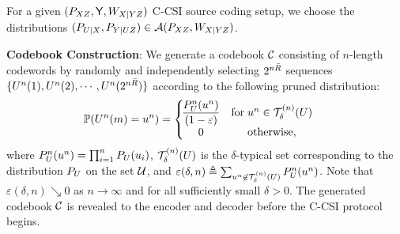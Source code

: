 \noindent For a given $({P}_{XZ},\mathsf{Y},W_{X|YZ})$ C-CSI source coding setup, we choose the distributions $(P_{U|X},P_{Y|UZ}) \in \mathcal{A}(P_{XZ},W_{X|YZ})$. 

\noindent \textbf{Codebook Construction}:
We generate a codebook $\mathcal{C}$ consisting of $n$-length codewords by randomly and independently selecting $2^{n\bar{R}}$ sequences $\{U^n(1),U^n(2),\cdots, U^n(2^{n\bar{R}})\}$ according to the following pruned distribution:
 \begin{align}\label{def:c_distribution}
     &\mathbb{P}(U^n(m) = u^n) = \left\{\!\!\!\!\begin{array}{cc}
          \dfrac{P_U^n(u^n)}{(1-\varepsilon)}  & \mbox{for} \; u^n \in \mathcal{T}_{{\delta}}^{(n)}({U})\\
           0 &  \mbox{otherwise,}
     \end{array} \right. \!\!
 \end{align} 
  where $ P_U^n(u^n) = \prod_{i=1}^n P_U(u_i)$, $\mathcal{T}_{{\delta}}^{(n)}({U})$ is the $\delta$-typical set corresponding to the distribution ${P}_U$ on the set $\mathcal{U}$, and $\varepsilon(\delta,n) \triangleq \sum_{u^n \not \in \mathcal{T}_{{\delta}}^{(n)}({U})} P_U^n(u^n)$. Note that $\varepsilon(\delta,n) \searrow 0$ as $n \rightarrow \infty$ and for all sufficiently small $\delta > 0$. 
 The generated codebook $\mathcal{C}$ is revealed to the encoder and decoder before the C-CSI protocol begins.


